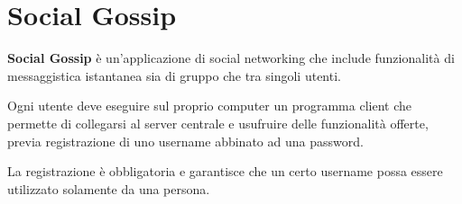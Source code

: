 \section{Social Gossip}
\textbf{Social Gossip} è un'applicazione di social networking che include funzionalità di messaggistica istantanea sia di gruppo che tra singoli utenti.

Ogni utente deve eseguire sul proprio computer un programma client che permette di collegarsi al server centrale e usufruire delle funzionalità offerte, previa registrazione di uno username abbinato ad una password.

La registrazione è obbligatoria e garantisce che un certo username possa essere utilizzato solamente da una persona.